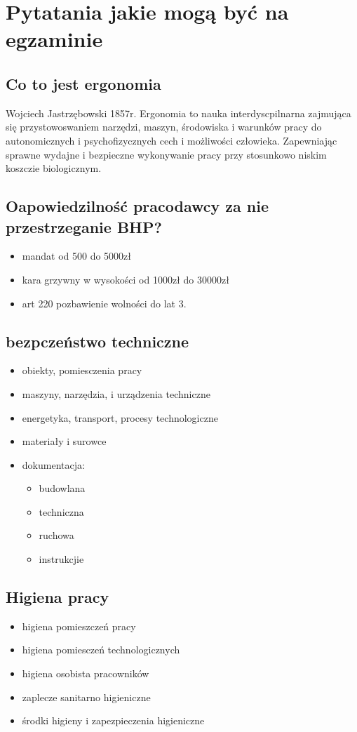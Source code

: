 \documentclass[11pt]{article}
\date{\today}
\title{}
\begin{document}
\tableofcontents

\section{Pytatania jakie mogą być na egzaminie}
\label{sec:orge5728c8}
\subsection{Co to jest ergonomia}
\label{sec:org646699f}
Wojciech Jastrzębowski 1857r.
Ergonomia to nauka interdyscpilnarna zajmująca się przystowoswaniem narzędzi, maszyn, środowiska i warunków pracy do autonomicznych i psychofizycznych cech i możliwości człowieka.
Zapewniając sprawne wydajne i bezpieczne wykonywanie pracy przy stosunkowo niskim koszczie biologicznym.
\subsection{Oapowiedzilność pracodawcy za nie przestrzeganie BHP?}
\label{sec:orgcf3e542}
\begin{itemize}
\item mandat od 500 do 5000zł
\item kara grzywny w wysokości od 1000zł do 30000zł
\item art 220 pozbawienie wolności do lat 3.
\end{itemize}
\subsection{bezpczeństwo techniczne}
\label{sec:org74c16fa}
\begin{itemize}
\item obiekty, pomiesczenia pracy
\item maszyny, narzędzia, i urządzenia techniczne
\item energetyka, transport, procesy technologiczne
\item materiały i surowce
\item dokumentacja:
\begin{itemize}
\item budowlana
\item techniczna
\item ruchowa
\item instrukcjie
\end{itemize}
\end{itemize}
\subsection{Higiena pracy}
\label{sec:org9fcc8fc}
\begin{itemize}
\item higiena pomieszczeń pracy
\item higiena pomiesczeń technologicznych
\item higiena osobista pracowników
\item zaplecze sanitarno higieniczne
\item środki higieny i zapezpieczenia higieniczne
\end{itemize}
\end{document}
